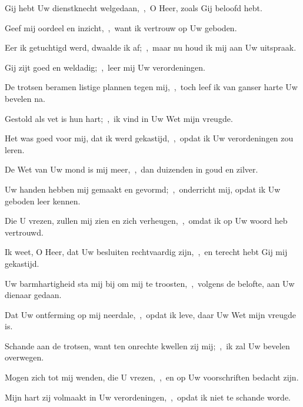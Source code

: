 \documentclass[12pt,twoside,a5paper]{article}
\begin{document}
\begin{halfparskip}
   Gij hebt Uw dienstknecht welgedaan,~\sep\ O Heer, zoals Gij beloofd hebt.


  Geef mij oordeel en inzicht,~\sep\ want ik vertrouw op Uw geboden.

  Eer ik getuchtigd werd, dwaalde ik af;~\sep\ maar nu houd ik mij aan Uw uitspraak.

  Gij zijt goed en weldadig;~\sep\ leer mij Uw verordeningen.

  De trotsen beramen listige plannen tegen mij,~\sep\ toch leef ik van ganser harte Uw bevelen na.

  Gestold als vet is hun hart;~\sep\ ik vind in Uw Wet mijn vreugde.

  Het was goed voor mij, dat ik werd gekastijd,~\sep\ opdat ik Uw verordeningen zou leren.

  De Wet van Uw mond is mij meer,~\sep\ dan duizenden in goud en zilver.
\end{halfparskip}

\begin{halfparskip}
   Uw handen hebben mij gemaakt en gevormd;~\sep\ onderricht mij, opdat ik Uw geboden leer kennen.


  Die U vrezen, zullen mij zien en zich verheugen,~\sep\ omdat ik op Uw woord heb vertrouwd.

  Ik weet, O Heer, dat Uw besluiten rechtvaardig zijn,~\sep\ en terecht hebt Gij mij gekastijd.

  Uw barmhartigheid sta mij bij om mij te troosten,~\sep\ volgens de belofte, aan Uw dienaar gedaan.

  Dat Uw ontferming op mij neerdale,~\sep\ opdat ik leve, daar Uw Wet mijn vreugde is.

  Schande aan de trotsen, want ten onrechte kwellen zij mij;~\sep\ ik zal Uw bevelen overwegen.

  Mogen zich tot mij wenden, die U vrezen,~\sep\ en op Uw voorschriften bedacht zijn.

  Mijn hart zij volmaakt in Uw verordeningen,~\sep\ opdat ik niet te schande worde.
\end{halfparskip}
\end{document}
